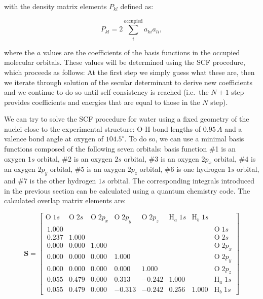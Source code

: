 \documentclass[
  9pt,
]{extbook}
\theoremstyle{definition}
\theoremstyle{definition}
\theoremstyle{definition}
\theoremstyle{remark}
\begin{document}
with the density matrix elements \(P_{kl}\) defined as:

\begin{equation}
P_{kl} = 2 \sum_{i}^{\mathrm{occupied}} a_{ki}a_{li},
\label{eq:densitymatrixelement}
\end{equation}

where the \(a\) values are the coefficients of the basis functions in the occupied molecular orbitals. These values will be determined using the SCF procedure, which proceeds as follows: At the first step we simply guess what these are, then we iterate through solution of the secular determinant to derive new coefficients and we continue to do so until self-consistency is reached (i.e.~the \(N+1\) step provides coefficients and energies that are equal to those in the \(N\) step).

We can try to solve the SCF procedure for water using a fixed geometry of the nuclei close to the experimental structure: O-H bond lengths of \(0.95\,\dot{A}\) and a valence bond angle at oxygen of \(104.5^\circ\). To do so, we can use a minimal basis functions composed of the following seven orbitals: basis function \#1 is an oxygen \(1s\) orbital, \#2 is an oxygen \(2s\) orbital, \#3 is an oxygen \(2p_x\) orbital, \#4 is an oxygen \(2p_y\) orbital, \#5 is an oxygen \(2p_z\) orbital, \#6 is one hydrogen \(1s\) orbital, and \#7 is the other hydrogen \(1s\) orbital. The corresponding integrals introduced in the previous section can be calculated using a quantum chemistry code. The calculated overlap matrix elements are:

\begin{equation}
\mathbf{S}=
\begin{bmatrix}
\mathrm{O}\;1s & \mathrm{O}\;2s & \mathrm{O}\;2p_x & \mathrm{O}\;2p_y & \mathrm{O}\;2p_z & \mathrm{H}_a\;1s & \mathrm{H}_b\;1s & \\\
1.000 & & & & & &  &\mathrm{O}\;1s \\\ 
0.237 & 1.000 & & & & &  &\mathrm{O}\;2s \\\
0.000 & 0.000 & 1.000 & & & & &\mathrm{O}\;2p_x \\\
0.000 & 0.000 & 0.000 & 1.000 & & & &\mathrm{O}\;2p_y \\\
0.000 & 0.000 & 0.000 & 0.000 & 1.000 & & &\mathrm{O}\;2p_z \\\
0.055 & 0.479 & 0.000 & 0.313 & -0.242 & 1.000 &  &\mathrm{H}_a\;1s \\\
0.055 & 0.479 & 0.000 & -0.313 & -0.242 & 0.256 & 1.000&\mathrm{H}_b\;1s 
\end{bmatrix}
\label{eq:smatrix}
\end{equation}
\end{document}
